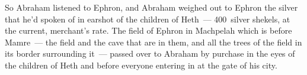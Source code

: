 \begin{inparaenum}
     So Abraham listened to Ephron, and Abraham weighed out to Ephron the silver that he'd spoken of in earshot of the children of Heth~--- 400~silver shekels, at the current, merchant's rate.%
     The field of Ephron in Machpelah which is before Mamre~--- the field and the cave that are in them, and all the trees of the field in its border surrounding it~--- passed over%
     to Abraham by purchase in the eyes of the children of Heth and before everyone entering in at the gate of his city.%
\end{inparaenum}
